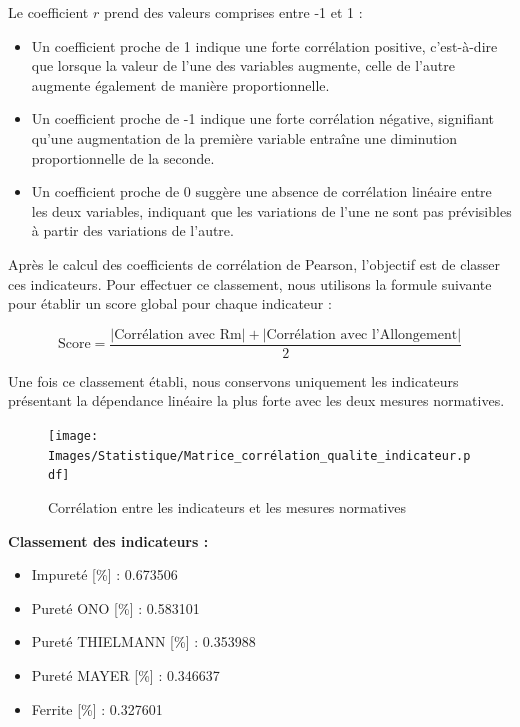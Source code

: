 \documentclass[12pt]{article}
\begin{document}
Le coefficient \( r \) prend des valeurs comprises entre -1 et 1 :
\begin{itemize}
    \item Un coefficient proche de 1 indique une forte corrélation positive, c'est-à-dire que lorsque la valeur de l'une des variables augmente, celle de l'autre augmente également de manière proportionnelle.
    \item Un coefficient proche de -1 indique une forte corrélation négative, signifiant qu'une augmentation de la première variable entraîne une diminution proportionnelle de la seconde.
    \item Un coefficient proche de 0 suggère une absence de corrélation linéaire entre les deux variables, indiquant que les variations de l'une ne sont pas prévisibles à partir des variations de l'autre.
\end{itemize}

Après le calcul des coefficients de corrélation de Pearson, l'objectif 
est de classer ces indicateurs.
Pour effectuer ce classement, nous utilisons 
la formule suivante pour établir un score global pour chaque indicateur :

\[
\text{Score} = \frac{|\text{Corrélation avec Rm}| + |\text{Corrélation avec l'Allongement}|}{2}
\]


Une fois ce classement établi, nous conservons uniquement les indicateurs 
présentant la dépendance linéaire la plus forte avec les deux mesures 
normatives. 


\begin{figure}[H]
    \texttt{[image: Images/Statistique/Matrice\_corrélation\_qualite\_indicateur.pdf]} 
    \caption{Corrélation entre les indicateurs et les mesures normatives}
    \label{fig:Corrélation1}
\end{figure}


\begin{center}
    \textbf{Classement des indicateurs :}
    \vspace{0.3cm} %
    \begin{itemize}
        \item Impureté [\%] : 0.673506
        \item Pureté ONO [\%] : 0.583101
        \item Pureté THIELMANN [\%] : 0.353988
        \item Pureté MAYER [\%] : 0.346637
        \item Ferrite [\%] : 0.327601
    \end{itemize}
\end{center}
\end{document}
